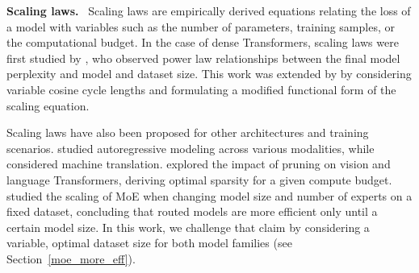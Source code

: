 \textbf{Scaling laws.} \ Scaling laws are empirically derived equations relating the loss of a model with variables such as the number of parameters, training samples, or the computational budget. In the case of dense Transformers, scaling laws were first studied by \cite{kaplan2020scaling}, who observed power law relationships between the final model perplexity and model and dataset size. This work was extended by \cite{hoffmann2022training} by considering variable cosine cycle lengths and formulating a modified functional form of the scaling equation.

Scaling laws have also been proposed for other architectures and training scenarios. \cite{henighan2020scaling} studied autoregressive modeling across various modalities, while \cite{ghorbani2021scaling} considered machine translation. \cite{frantar2023scaling} explored the impact of pruning on vision and language Transformers, deriving optimal sparsity for a given compute budget. \cite{clark2022unified} studied the scaling of MoE when changing model size and number of experts on a fixed dataset, concluding that routed models are more efficient only until a certain model size. In this work, we challenge that claim by considering a variable, optimal dataset size for both model families (see Section~\ref{moe_more_eff}).

